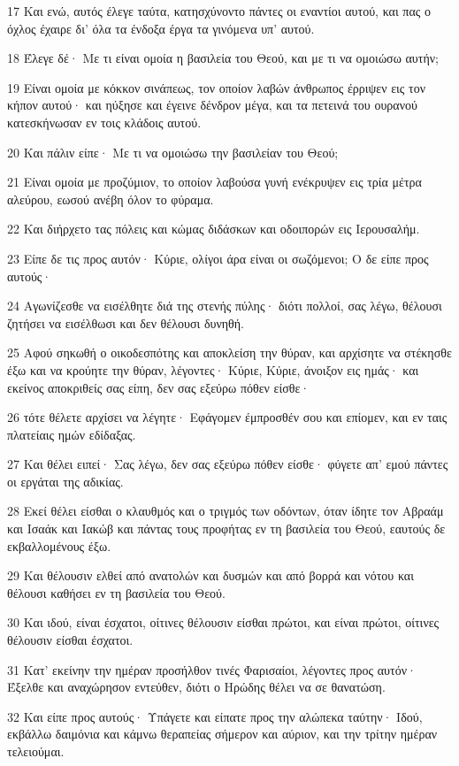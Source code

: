 \par 17 Και ενώ, αυτός έλεγε ταύτα, κατησχύνοντο πάντες οι εναντίοι αυτού, και πας ο όχλος έχαιρε δι' όλα τα ένδοξα έργα τα γινόμενα υπ' αυτού.
\par 18 Έλεγε δέ· Με τι είναι ομοία η βασιλεία του Θεού, και με τι να ομοιώσω αυτήν;
\par 19 Είναι ομοία με κόκκον σινάπεως, τον οποίον λαβών άνθρωπος έρριψεν εις τον κήπον αυτού· και ηύξησε και έγεινε δένδρον μέγα, και τα πετεινά του ουρανού κατεσκήνωσαν εν τοις κλάδοις αυτού.
\par 20 Και πάλιν είπε· Με τι να ομοιώσω την βασιλείαν του Θεού;
\par 21 Είναι ομοία με προζύμιον, το οποίον λαβούσα γυνή ενέκρυψεν εις τρία μέτρα αλεύρου, εωσού ανέβη όλον το φύραμα.
\par 22 Και διήρχετο τας πόλεις και κώμας διδάσκων και οδοιπορών εις Ιερουσαλήμ.
\par 23 Είπε δε τις προς αυτόν· Κύριε, ολίγοι άρα είναι οι σωζόμενοι; Ο δε είπε προς αυτούς·
\par 24 Αγωνίζεσθε να εισέλθητε διά της στενής πύλης· διότι πολλοί, σας λέγω, θέλουσι ζητήσει να εισέλθωσι και δεν θέλουσι δυνηθή.
\par 25 Αφού σηκωθή ο οικοδεσπότης και αποκλείση την θύραν, και αρχίσητε να στέκησθε έξω και να κρούητε την θύραν, λέγοντες· Κύριε, Κύριε, άνοιξον εις ημάς· και εκείνος αποκριθείς σας είπη, δεν σας εξεύρω πόθεν είσθε·
\par 26 τότε θέλετε αρχίσει να λέγητε· Εφάγομεν έμπροσθέν σου και επίομεν, και εν ταις πλατείαις ημών εδίδαξας.
\par 27 Και θέλει ειπεί· Σας λέγω, δεν σας εξεύρω πόθεν είσθε· φύγετε απ' εμού πάντες οι εργάται της αδικίας.
\par 28 Εκεί θέλει είσθαι ο κλαυθμός και ο τριγμός των οδόντων, όταν ίδητε τον Αβραάμ και Ισαάκ και Ιακώβ και πάντας τους προφήτας εν τη βασιλεία του Θεού, εαυτούς δε εκβαλλομένους έξω.
\par 29 Και θέλουσιν ελθεί από ανατολών και δυσμών και από βορρά και νότου και θέλουσι καθήσει εν τη βασιλεία του Θεού.
\par 30 Και ιδού, είναι έσχατοι, οίτινες θέλουσιν είσθαι πρώτοι, και είναι πρώτοι, οίτινες θέλουσιν είσθαι έσχατοι.
\par 31 Κατ' εκείνην την ημέραν προσήλθον τινές Φαρισαίοι, λέγοντες προς αυτόν· Έξελθε και αναχώρησον εντεύθεν, διότι ο Ηρώδης θέλει να σε θανατώση.
\par 32 Και είπε προς αυτούς· Υπάγετε και είπατε προς την αλώπεκα ταύτην· Ιδού, εκβάλλω δαιμόνια και κάμνω θεραπείας σήμερον και αύριον, και την τρίτην ημέραν τελειούμαι.
